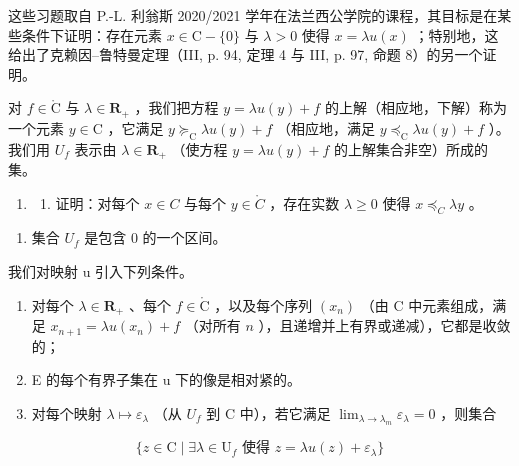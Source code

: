 这些习题取自 P.-L. 利翁斯 2020/2021 学年在法兰西公学院的课程，其目标是在某些条件下证明：存在元素 \(x \in \mathrm{C} - \{0\}\) 与 \(\lambda > 0\) 使得 \(x = \lambda u(x)\) ；特别地，这给出了克赖因–鲁特曼定理（III, p. 94, 定理 4 与 III, p. 97, 命题 8）的另一个证明。

对 \(f \in \mathring{\mathrm{C}}\) 与 \(\lambda \in \mathbf{R}_{+}\) ，我们把方程 \(y = \lambda u(y) + f\) 的上解（相应地，下解）称为一个元素 \(y \in \mathrm{C}\) ，它满足 \(y \succcurlyeq_{\mathrm{C}} \lambda u(y) + f\) （相应地，满足 \(y \preccurlyeq_{\mathrm{C}} \lambda u(y) + f\) ）。我们用 \(U_{f}\) 表示由 \(\lambda \in \mathbf{R}_{+}\) （使方程 \(y = \lambda u(y) + f\) 的上解集合非空）所成的集。

\begin{enumerate}
\def\labelenumi{\arabic{enumi})}
\setcounter{enumi}{24}
\tightlist
\item
  \begin{enumerate}
  \def\labelenumii{\alph{enumii})}
  \tightlist
  \item
    证明：对每个 \(x \in C\) 与每个 \(y \in \mathring{C}\) ，存在实数 \(\lambda \geqslant 0\) 使得 \(x \preccurlyeq_{C} \lambda y\) 。
  \end{enumerate}
\end{enumerate}

\begin{enumerate}
\def\labelenumi{\alph{enumi})}
\setcounter{enumi}{1}
\tightlist
\item
  集合 \(U_{f}\) 是包含 0 的一个区间。
\end{enumerate}

我们对映射 u 引入下列条件。

\begin{enumerate}
\def\labelenumi{(\roman{enumi})}
\setcounter{enumi}{3}
\item
  对每个 \(\lambda \in \mathbf{R}_{+}\) 、每个 \(f \in \mathring{\mathrm{C}}\) ，以及每个序列 \((x_{n})\) （由 C 中元素组成，满足 \(x_{n+1} = \lambda u(x_{n}) + f\) （对所有 \(n\) ），且递增并上有界或递减），它都是收敛的；
\item
  E 的每个有界子集在 u 下的像是相对紧的。
\item
  对每个映射 \(\lambda \mapsto \varepsilon_{\lambda}\) （从 \(U_f\) 到 C 中），若它满足 \(\lim_{\lambda \to \lambda_m} \varepsilon_{\lambda} = 0\) ，则集合
\end{enumerate}

\[
\{z \in \mathrm{C} \mid \exists \lambda \in \mathrm{U}_{f}\text{ 使得 } z = \lambda u(z) + \varepsilon_{\lambda} \}
\]

